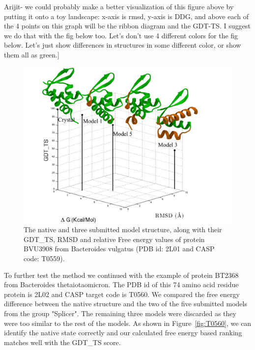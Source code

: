 \documentclass[12pt]{article}
\newcommand{\Ken}[1]{\color{red}#1\normalcolor}
\begin{document}
\Ken{Arijit- we could probably make a better visualization of this figure above by putting it onto a toy landscape: x-axis is rmsd, y-axis is DDG, and above each of the 4 points on this graph will be the ribbon diagram and the GDT-TS.  I suggest we do that with the fig below too.  Let's don't use 4 different colors for the fig below.  Let's just show differences in structures in some different color, or show them all as green.]}

\begin{figure}
\begin{center}
\includegraphics[width=3.8 in,height=3.2 in]{T0559.pdf}
\end{center}
\caption{The native and three submitted model structure, along with their GDT\_TS, RMSD and relative Free energy values
of protein BVU3908 from Bacteroides vulgatus (PDB id: 2L01 and CASP code: T0559).}
\label{fig:T0559}
\end{figure}


To further test the method we continued with the example of protein BT2368 from Bacteroides
thetaiotaomicron. The PDB id of this 74 amino acid residue protein is 2L02 and CASP target code is
T0560. We compared the free energy difference between the native structure and the two of the
five submitted models from the group "Splicer". The remaining three models were discarded as 
they were too similar to the rest of the models. As shown in Figure~\ref{fig:T0560}, we can identify 
the native state correctly and our calculated free energy based ranking matches well with the
GDT\_TS score. 
\end{document}
